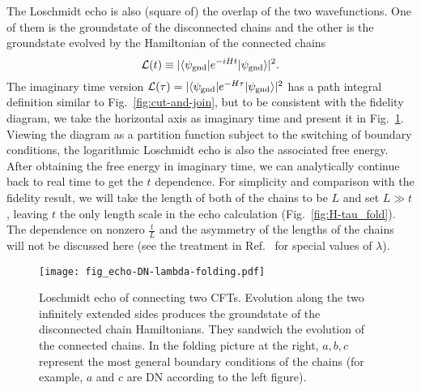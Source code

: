The Loschmidt echo is also (square of) the overlap of the two wavefunctions. One of them is the groundstate of the disconnected chains and the other is the groundstate evolved by the Hamiltonian of the connected chains
\begin{equation}
\mathcal{L}( t )  \equiv |\langle \psi_{\rm gnd}  | e^{-i H t } | \psi_{\rm gnd} \rangle|^2 .
\end{equation}
The imaginary time version $\mathcal{L}( \tau  ) = |\langle \psi_{\rm gnd}  | e^{-H \tau } | \psi_{\rm gnd} \rangle|^2$ has a path integral definition similar to Fig.~\ref{fig:cut-and-join}, but to be consistent with the fidelity diagram, we take the horizontal axis as imaginary time and present it in Fig.~\ref{fig:echo}. Viewing the diagram as a partition function subject to the switching of boundary conditions, the logarithmic Loschmidt echo is also the associated free energy. After obtaining the free energy in imaginary time, we can analytically continue back to real time to get the $t$ dependence. For simplicity and comparison with the fidelity result, we will take the length of both of the chains to be $L$ and set $L \gg t$, leaving $t$ the only length scale in the echo calculation (Fig.~\ref{fig:H-tau_fold}). The dependence on nonzero $\frac{t}{L}$ and the asymmetry of the lengths of the chains will not be discussed here (see the treatment in Ref.~ for special values of $\lambda$).

\begin{figure}[h]
\centering
\texttt{[image: fig\_echo-DN-lambda-folding.pdf]}
\caption{Loschmidt echo of connecting two CFTs. Evolution along the two infinitely extended sides produces the groundstate of the disconnected chain Hamiltonians. They sandwich the evolution of the connected chains. In the folding picture at the right, $a,b,c$ represent the most general boundary conditions of the chains (for example, $a$ and $c$ are DN according to the left figure).}
\label{fig:echo}
\end{figure}

